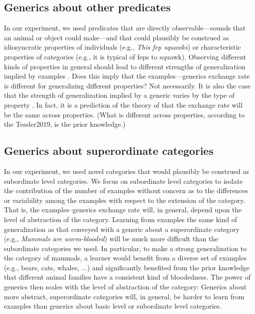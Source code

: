 \documentclass[10pt,letterpaper]{article}
\begin{document}
\subsection{Generics about other predicates}

In our experiment, we used predicates that are directly observable---sounds that an animal or object could make---and that could plausibly be construed as idiosyncratic properties of individuals (e.g., \emph{This fep squawks}) or characteristic properties of categories (e.g., it is typical of feps to squawk).
Observing different kinds of properties in general should lead to different strengths of generalization implied by examples \cite{Nisbett1983}. 
Does this imply that the examples---generics exchange rate is different for generalizing different properties?
Not necessarily.
It is also the case that the strength of generalization implied by a generic varies by the type of property \cite{Tessler2020}. 
In fact, it is a prediction of the theory of  that the exchange rate will be the same across properties. (What is different across properties, according to the Tessler2019, is the prior knowledge.)

\subsection{Generics about superordinate categories}

In our experiment, we used novel categories that would plausibly be construed as subordinate level categories.
We focus on subordinate level categories to isolate the contribution of the number of examples without concern as to the differences or variability among the examples with respect to the extension of the category.
That is, the examples--generics exchange rate will, in general, depend upon the level of abstraction of the category. 
Learning from examples the same kind of generalization as that conveyed with a generic about a superordinate category (e.g., \emph{Mammals are worm-blooded}) will be much more difficult than the subordinate categories we used. 
In particular, to make a strong generalization to the category of mammals, a learner would benefit from a diverse set of examples (e.g., bears, cats, whales, ...) and significantly benefited from the prior knowledge that different animal families have a consistent kind of bloodedness. 
The power of generics then scales with the level of abstraction of the category: Generics about more abstract, superordinate categories will, in general, be harder to learn from examples than generics about basic level or subordinate level categories. 
\end{document}
